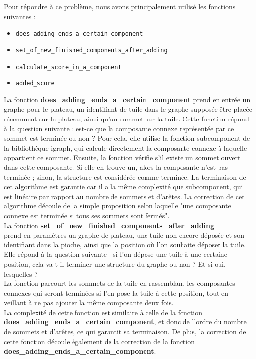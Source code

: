 Pour répondre à ce problème, nous avons principalement utilisé les fonctions suivantes :
\begin{itemize}
    \item \texttt{does\_adding\_ends\_a\_certain\_component}
    \item \texttt{set\_of\_new\_finished\_components\_after\_adding}
    \item \texttt{calculate\_score\_in\_a\_component}
    \item \texttt{added\_score}
\end{itemize}
La fonction \textbf{does\_adding\_ends\_a\_certain\_component} prend en entrée un graphe pour le plateau, un identifiant de tuile dans le graphe supposée être placée récemment sur le plateau, ainsi qu'un sommet sur la tuile. Cette fonction répond à la question suivante : est-ce que la composante connexe représentée par ce sommet est terminée ou non ? Pour cela, elle utilise la fonction subcomponent de la bibliothèque igraph, qui calcule directement la composante connexe à laquelle appartient ce sommet. Ensuite, la fonction vérifie s'il existe un sommet ouvert dans cette composante. Si elle en trouve un, alors la composante n'est pas terminée ; sinon, la structure est considérée comme terminée. La terminaison de cet algorithme est garantie car il a la même complexité que subcomponent, qui est linéaire par rapport au nombre de sommets et d'arêtes. La correction de cet algorithme découle de la simple proposition selon laquelle "une composante connexe est terminée si tous ses sommets sont fermés".\\
La fonction \textbf{set\_of\_new\_finished\_components\_after\_adding}\\ prend en paramètres un graphe de plateau, une tuile non encore déposée et son identifiant dans la pioche, ainsi que la position où l'on souhaite déposer la tuile. Elle répond à la question suivante : si l'on dépose une tuile à une certaine position, cela va-t-il terminer une structure du graphe ou non ? Et si oui, lesquelles ?\\

La fonction parcourt les sommets de la tuile en rassemblant les composantes connexes qui seront terminées si l'on pose la tuile à cette position, tout en veillant à ne pas ajouter la même composante deux fois.\\
La complexité de cette fonction est similaire à celle de la fonction \\\textbf{does\_adding\_ends\_a\_certain\_component}, et donc de l'ordre du nombre de sommets et d'arêtes, ce qui garantit sa terminaison. De plus, la correction de cette fonction découle également de la correction de la fonction \\\textbf{does\_adding\_ends\_a\_certain\_component}.\\

